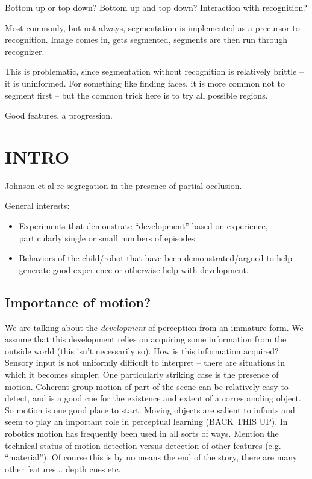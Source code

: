 Bottom up or top down?  Bottom up and top down?  Interaction
with recognition?

Most commonly, but not always, segmentation is implemented
as a precursor to recognition.  Image comes in, gets
segmented, segments are then run through recognizer.

This is problematic, since segmentation without
recognition is relatively brittle -- it is uninformed.
For something like finding faces, it is more common
not to segment first -- but the common trick here
is to try all possible regions.

Good features, a progression.


\section{INTRO}


Johnson et al re segregation in the presence of partial occlusion.



\noindent General interests:

\begin{itemize}

\item Experiments that demonstrate ``development'' based on experience,
   particularly single or small numbers of episodes

\item Behaviors of the child/robot that have been demonstrated/argued
   to help generate good experience or otherwise help with development.

\end{itemize}


\subsection{Importance of motion?}

We are talking about the {\em development} of perception from an
immature form.  We assume that this development relies on acquiring
some information from the outside world (this isn't necessarily so).
How is this information acquired?  Sensory input is not 
uniformly difficult to interpret -- there are situations in
which it becomes simpler.  One particularly striking case is
the presence of motion.  Coherent group motion of part of the 
scene can be relatively easy to detect, and is a good cue for
the existence and extent of a corresponding object.  
So motion is one good place to start.
%
Moving objects are salient to infants and seem to play an
important role in perceptual learning (BACK THIS UP).
%
In robotics motion has frequently been used in all sorts of
ways.
%
Mention the technical status of motion detection versus
detection of other features (e.g. ``material'').
%
Of course this is by no means the end of the story, there 
are many other features... depth cues etc.

